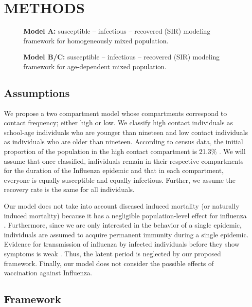 \documentclass[a4paper, 12pt, journal]{ieeeconf}\usepackage[]{graphicx}\usepackage[]{color}
\begin{document}
\section{METHODS}

\begin{figure}[thpb]
	\centering
   	\resizebox{0.46\textwidth}{!}{}
    \caption{\textbf{Model A:} susceptible – infectious – recovered (SIR) modeling framework for homogeneously mixed population.}\label{F:homo}
\end{figure}

\begin{figure}[thpb]
    \resizebox{0.46\textwidth}{!}{}
    \caption{\textbf{Model B/C:} susceptible – infectious – recovered (SIR) modeling framework for age-dependent mixed population.}\label{F:het}
\end{figure}

\subsection{Assumptions}
We propose a two compartment model whose compartments correspond to contact frequency; either high or low. We classify high contact individuals as school-age individuals who are younger than nineteen and low contact individuals as individuals who are older than nineteen. According to census data, the initial proportion of the population in the high contact compartment is 21.3\% \cite{statsCanada}. We will assume that once classified, individuals remain in their respective compartments for the duration of the Influenza epidemic and that in each compartment, everyone is equally susceptible and equally infectious. Further, we assume the recovery rate is the same for all individuals.

Our model does not take into account diseased induced mortality (or naturally induced mortality) because it has a negligible population-level effect for influenza \cite{InfluenzaPeriod}.
Furthermore, since we are only interested in the behavior of a single epidemic, individuals are assumed to acquire permanent immunity during a single epidemic.
Evidence for transmission of influenza by infected individuals before they show symptoms is weak \cite{InfluenzaLatentPeriod}. Thus, the latent period is neglected by our proposed framework. Finally, our model does not consider the possible effects of vaccination against Influenza. 

\subsection{Framework}
\end{document}
